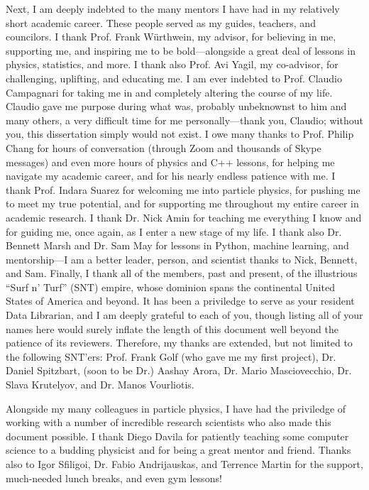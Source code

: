 \begin{acknowledgements}
Next, I am deeply indebted to the many mentors I have had in my relatively short academic career. 
These people served as my guides, teachers, and councilors. 
I thank Prof. Frank W\"urthwein, my advisor, for believing in me, supporting me, and inspiring me to be bold---alongside a great deal of lessons in physics, statistics, and more. 
I thank also Prof. Avi Yagil, my co-advisor, for challenging, uplifting, and educating me. 
I am ever indebted to Prof. Claudio Campagnari for taking me in and completely altering the course of my life. 
Claudio gave me purpose during what was, probably unbeknownst to him and many others, a very difficult time for me personally---thank you, Claudio; without you, this dissertation simply would not exist. 
I owe many thanks to Prof. Philip Chang for hours of conversation (through Zoom and thousands of Skype messages) and even more hours of physics and C++ lessons, for helping me navigate my academic career, and for his nearly endless patience with me. 
I thank Prof. Indara Suarez for welcoming me into particle physics, for pushing me to meet my true potential, and for supporting me throughout my entire career in academic research. 
I thank Dr. Nick Amin for teaching me everything I know and for guiding me, once again, as I enter a new stage of my life. 
I thank also Dr. Bennett Marsh and Dr. Sam May for lessons in Python, machine learning, and mentorship---I am a better leader, person, and scientist thanks to Nick, Bennett, and Sam. 
Finally, I thank all of the members, past and present, of the illustrious ``Surf n' Turf'' (SNT) empire, whose dominion spans the continental United States of America and beyond. 
It has been a priviledge to serve as your resident Data Librarian, and I am deeply grateful to each of you, though listing all of your names here would surely inflate the length of this document well beyond the patience of its reviewers. 
Therefore, my thanks are extended, but not limited to the following SNT'ers: Prof. Frank Golf (who gave me my first project), Dr. Daniel Spitzbart, (soon to be Dr.) Aashay Arora, Dr. Mario Masciovecchio, Dr. Slava Krutelyov, and Dr. Manos Vourliotis.

Alongside my many colleagues in particle physics, I have had the priviledge of working with a number of incredible research scientists who also made this document possible. 
I thank Diego Davila for patiently teaching some computer science to a budding physicist and for being a great mentor and friend. 
Thanks also to Igor Sfiligoi, Dr. Fabio Andrijauskas, and Terrence Martin for the support, much-needed lunch breaks, and even gym lessons! 


\end{acknowledgements}
